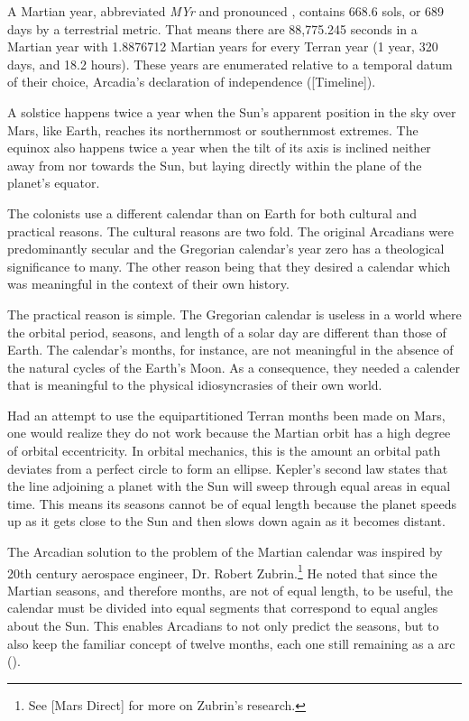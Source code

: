 A Martian year, abbreviated {\it MYr} and pronounced , contains 668.6 sols, or 689 days by a terrestrial metric. That means there are 88,775.245 seconds in a Martian year with 1.8876712 Martian years for every Terran year (1 year, 320 days, and 18.2 hours). These years are enumerated relative to a temporal datum of their choice, Arcadia's declaration of independence ([Timeline]).


A solstice happens twice a year when the Sun's apparent position in the sky over Mars, like Earth, reaches its northernmost or southernmost extremes. The equinox also happens twice a year when the tilt of its axis is inclined neither away from nor towards the Sun, but laying directly within the plane of the planet's equator.


The colonists use a different calendar than on Earth for both cultural and practical reasons. The cultural reasons are two fold. The original Arcadians were predominantly secular and the Gregorian calendar's year zero has a theological significance to many. The other reason being that they desired a calendar which was meaningful in the context of their own history.

The practical reason is simple. The Gregorian calendar is useless in a world where the orbital period, seasons, and length of a solar day are different than those of Earth. The calendar's months, for instance, are not meaningful in the absence of the natural cycles of the Earth's Moon. As a consequence, they needed a calender that is meaningful to the physical idiosyncrasies of their own world.

Had an attempt to use the equipartitioned Terran months been made on Mars, one would realize they do not work because the Martian orbit has a high degree of orbital eccentricity. In orbital mechanics, this is the amount an orbital path deviates from a perfect circle to form an ellipse. Kepler's second law states that the line adjoining a planet with the Sun will sweep through equal areas in equal time. This means its seasons cannot be of equal length because the planet speeds up as it gets close to the Sun and then slows down again as it becomes distant.

The Arcadian solution to the problem of the Martian calendar was inspired by 20th century aerospace engineer, Dr. Robert Zubrin.\footnote{See [Mars Direct] for more on Zubrin's research.} He noted that since the Martian seasons, and therefore months, are not of equal length, to be useful, the calendar must be divided into equal segments that correspond to equal angles about the Sun. This enables Arcadians to not only predict the seasons, but to also keep the familiar concept of twelve months, each one still remaining as a  arc (). 

